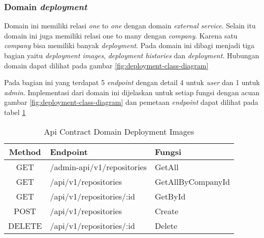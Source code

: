 \subsubsection{Domain \textit{deployment}}

Domain ini memiliki relasi \textit{one} to \textit{one} dengan domain \textit{external service}. Selain itu domain ini juga memiliki relasi one to many dengan \textit{company}. Karena satu \textit{company} bisa memiliki banyak \textit{deployment}. Pada domain ini dibagi menjadi tiga bagian yaitu \textit{deployment images}, \textit{deployment histories} dan \textit{deployment}. Hubungan domain dapat dilihat pada gambar \ref{fig:deployment-class-diagram}

Pada bagian ini yang terdapat 5 \textit{endpoint} dengan detail 4 untuk \textit{user} dan 1 untuk \textit{admin}. Implementasi dari domain ini dijelaskan untuk setiap fungsi dengan acuan gambar \ref{fig:deployment-class-diagram} dan pemetaan \textit{endpoint} dapat dilihat pada tabel \ref{tab:api-contract-domain-deployment-images}

\bgroup
\begin{table}[ht]
  \caption{Api Contract Domain Deployment Images}
  \label{tab:api-contract-domain-deployment-images}
  \def\arraystretch{1.7}
  \centering
  \begin{tabular}{|c|p{6cm}|p{4cm}|}
    \hline
    Method & Endpoint                   &
    Fungsi                                                  \\
    \hline
    GET    & /admin-api/v1/repositories & GetAll            \\
    \hline
    GET    & /api/v1/repositories       & GetAllByCompanyId \\
    \hline
    GET    & /api/v1/repositories/:id   & GetById           \\
    \hline
    POST   & /api/v1/repositories       & Create            \\
    \hline
    DELETE & /api/v1/repositories/:id   & Delete            \\
    \hline
  \end{tabular}
\end{table}
\egroup

\pagebreak

